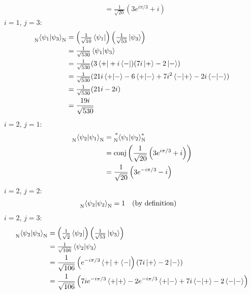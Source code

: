 \documentclass[11pt]{article}
\DeclareMathOperator\conj{conj}
\begin{document}
\begin{enumerate}[label=\textbf{\arabic*.}, start=2]
{\begin{enumerate}[label=\textbf{(\alph*)}]
{\begin{align*}
                        &=\frac{1}{\sqrt{20}}\left(3e^{i\pi/3}+i\right)
                    \end{align*}
                    \(i=1\), \(j=3\):
                    \begin{align*}
                        \prescript{}{\mathrm{N}}{\braket{\psi_1|\psi_3}_\mathrm{N}}&=\left(\tfrac{1}{\sqrt{10}}\bra{\psi_1}\right)\left(\tfrac{1}{\sqrt{53}}\ket{\psi_3}\right) \\
                        &=\tfrac{1}{\sqrt{530}}\braket{\psi_1|\psi_3} \\
                        &=\tfrac{1}{\sqrt{530}}(3\bra{+}+i\bra{-})(7i\ket{+}-2\ket{-}) \\
                        &=\tfrac{1}{\sqrt{530}}(21i\braket{+|-}-6\braket{+|-}+7i^2\braket{-|+}-2i\braket{-|-}) \\
                        &=\tfrac{1}{\sqrt{530}}(21i-2i) \\
                        &=\frac{19i}{\sqrt{530}}
                    \end{align*}
                    \(i=2\), \(j=1\):
                    \begin{align*}
                        \prescript{}{\mathrm{N}}{\braket{\psi_2|\psi_1}_\mathrm{N}}&=\prescript{*}{\mathrm{N}}{\braket{\psi_1|\psi_2}_\mathrm{N}^*} \\
                        &=\conj\left(\frac{1}{\sqrt{20}}\left(3e^{i\pi/3}+i\right)\right) \\
                        &=\frac{1}{\sqrt{20}}\left(3e^{-i\pi/3}-i\right)
                    \end{align*}
                    \(i=2\), \(j=2\):
                    \begin{align*}
                        \prescript{}{\mathrm{N}}{\braket{\psi_2|\psi_2}_\mathrm{N}}&=1\quad\text{(by definition)}
                    \end{align*}
                    \(i=2\), \(j=3\):
                    \begin{align*}
                        \prescript{}{\mathrm{N}}{\braket{\psi_2|\psi_3}_\mathrm{N}}&=\left(\tfrac{1}{\sqrt{2}}\bra{\psi_2}\right)\left(\tfrac{1}{\sqrt{53}}\ket{\psi_3}\right) \\
                        &=\tfrac{1}{\sqrt{106}}\braket{\psi_2|\psi_3} \\
                        &=\frac{1}{\sqrt{106}}\left(e^{-i\pi/3}\bra{+}+\bra{-}\right)(7i\ket{+}-2\ket{-}) \\
                        &=\frac{1}{\sqrt{106}}\left(7ie^{-i\pi/3}\braket{+|+}-2e^{-i\pi/3}\braket{+|-}+7i\braket{-|+}-2\braket{-|-}\right) \\

\end{align*}}
\end{enumerate}}
\end{enumerate}
\end{document}

